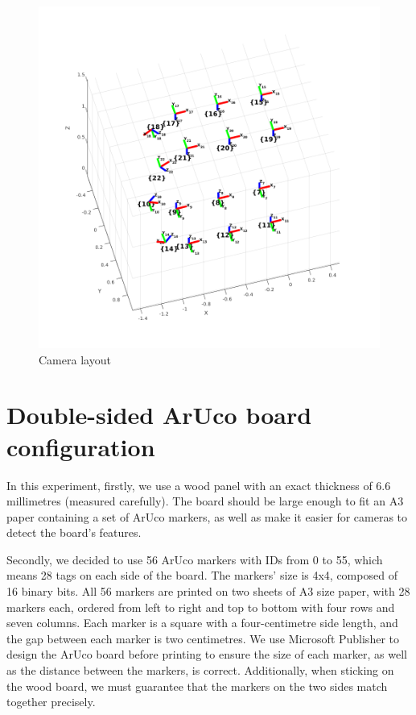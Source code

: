 \begin{figure}[ht]
\centering
\includegraphics[width=1\textwidth]{Images/Camera layout.png}
\caption{Camera layout}
\end{figure}

\clearpage
\section{Double-sided ArUco board configuration}
In this experiment, firstly, we use a wood panel with an exact thickness of 6.6 millimetres (measured carefully). The board should be large enough to fit an A3 paper containing a set of ArUco markers, as well as make it easier for cameras to detect the board's features.

Secondly, we decided to use 56 ArUco markers with IDs from 0 to 55, which means 28 tags on each side of the board. The markers' size is 4x4, composed of 16 binary bits. All 56 markers are printed on two sheets of A3 size paper, with 28 markers each, ordered from left to right and top to bottom with four rows and seven columns. Each marker is a square with a four-centimetre side length, and the gap between each marker is two centimetres. We use Microsoft Publisher to design the ArUco board before printing to ensure the size of each marker, as well as the distance between the markers, is correct. Additionally, when sticking on the wood board, we must guarantee that the markers on the two sides match together precisely.

